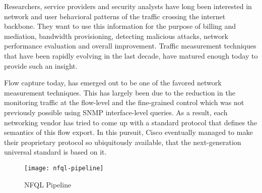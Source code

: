 Researchers, service providers and security analysts have long been interested
in network and user behavioral patterns of the traffic crossing the internet
backbone. They want to use this information for the purpose of billing and
mediation, bandwidth provisioning, detecting malicious attacks, network
performance evaluation and overall improvement. Traffic measurement techniques
that have been rapidly evolving in the last decade, have matured enough today
to provide such an insight.

Flow capture today, has emerged out to be one of the favored network
measurement techniques. This has largely been due to the reduction in the
monitoring traffic at the flow-level and the fine-grained control which was
not previously possible using SNMP interface-level queries. As a result,
each networking vendor has tried to come up with a standard protocol that
defines the semantics of this flow export. In this pursuit, Cisco eventually
managed to make their proprietary protocol so ubiquitously available, that the
next-generation universal standard is based on it.


\begin{figure*}[!t]
\centering
\texttt{[image: nfql-pipeline]}
\caption{NFQL Pipeline \cite{vmarinov:2009}}
\label{fig:nfql-pipeline}
\end{figure*}
